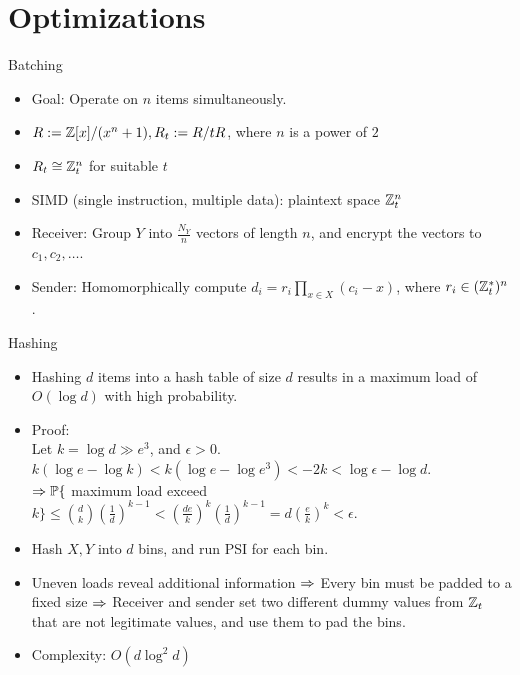 \section{Optimizations}

\begin{frame}{Batching}
\begin{itemize}
\item Goal: Operate on $n$ items simultaneously.
\item $R:=\mathbb{Z}[x]/(x^n+1), R_t:=R/tR$, where $n$ is a power of $2$
\item $R_t\cong\mathbb{Z}_t^n$ for suitable $t$
\item SIMD (single instruction, multiple data): plaintext space $\mathbb{Z}_t^n$
\item Receiver: Group $Y$ into $\frac{N_Y}n$ vectors of length $n$, and encrypt the vectors to $c_1, c_2, \dots$.
\item Sender: Homomorphically compute $d_i=r_i\prod_{x\in X}(c_i-x)$, where $r_i\in(\mathbb{Z}_t^*)^n$.
\end{itemize}
\end{frame}

\begin{frame}{Hashing}
\begin{itemize}
\item Hashing $d$ items into a hash table of size $d$ results in a maximum load of $O(\log d)$ with high probability.
\item Proof:\\
Let $k=\log d\gg e^3$, and $\epsilon>0$.\\
$k(\log e-\log k)<k(\log e-\log e^3)<-2k<\log\epsilon-\log d$.\\
$\Rightarrow\mathbb{P}\{$ maximum load exceed $k\}\leq\binom dk(\frac1d)^{k-1}<(\frac{de}k)^k(\frac1d)^{k-1}=d(\frac ek)^k<\epsilon$.
\item Hash $X, Y$ into $d$ bins, and run PSI for each bin.
\item Uneven loads reveal additional information $\Rightarrow$ Every bin must be padded to a fixed size $\Rightarrow$ Receiver and sender set two different dummy values from $\mathbb{Z}_t$ that are not legitimate values, and use them to pad the bins.
\item Complexity: $O(d\log^2d)$
\end{itemize}
\end{frame}

